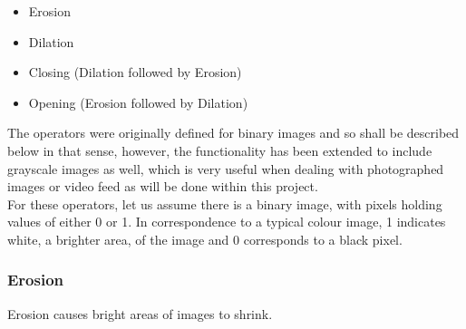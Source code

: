 \documentclass[11pt]{report}
\begin{document}
\begin{itemize}
	\item Erosion	
	\item Dilation
	\item Closing (Dilation followed by Erosion)
	\item Opening (Erosion followed by Dilation)
\end{itemize}

The operators were originally defined for binary images and so shall be 
described below in that sense, however, the functionality has been extended
to include grayscale images as well, which is very useful when dealing with
photographed images or video feed as will be done within this project.
\\
For these operators, let us assume there is a binary image, with pixels 
holding values of either 0 or 1. In correspondence to a typical colour image,
1 indicates white, a brighter area, of the image and 0 corresponds to a
black pixel. 


\subsubsection*{Erosion}
\begin{center}
Erosion causes bright areas of images to shrink.
\end{center}
\end{document}
